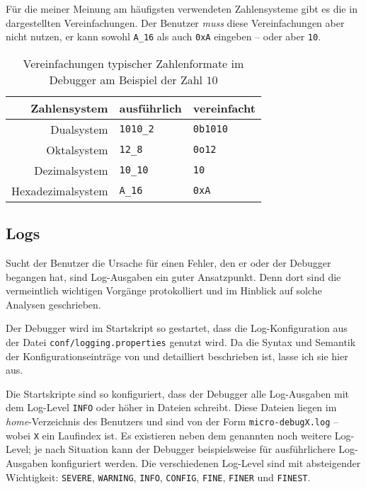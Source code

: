 Für die meiner Meinung am häufigsten verwendeten Zahlensysteme gibt es die in  dargestellten Vereinfachungen. Der Benutzer \emph{muss} diese Vereinfachungen aber nicht nutzen, er kann sowohl \texttt{A\_16} als auch \texttt{0xA} eingeben -- oder aber \texttt{10}.

\begin{table}[h]
  \centering
  \begin{tabular}[h]{|rll|}
    \hline
    \textbf{Zahlensystem} & \textbf{ausführlich} & \textbf{vereinfacht}\\
    \hline
    Dualsystem        & \texttt{1010\_2} & \texttt{0b1010} \\
    Oktalsystem       & \texttt{12\_8}   & \texttt{0o12}   \\
    Dezimalsystem     & \texttt{10\_10}  & \texttt{10}     \\
    Hexadezimalsystem & \texttt{A\_16}   & \texttt{0xA}    \\
    \hline
  \end{tabular}
  \caption{Vereinfachungen typischer Zahlenformate im Debugger am Beispiel der Zahl $10$}
\end{table}

\subsection{Logs}
Sucht der Benutzer die Ursache für einen Fehler, den er oder der Debugger begangen hat, sind Log-Ausgaben ein guter Ansatzpunkt. Denn dort sind die vermeintlich wichtigen Vorgänge protokolliert und im Hinblick auf solche Analysen geschrieben.

Der Debugger wird im Startskript so gestartet, dass die Log-Konfiguration aus der Datei \texttt{conf/logging.properties} genutzt wird. Da die Syntax und Semantik der Konfigurationseinträge von  \cite{Oracle2004} und  \cite{Vogel2012} detailliert beschrieben ist, lasse ich sie hier aus.

Die Startskripte sind so konfiguriert, dass der Debugger alle Log-Ausgaben mit dem Log-Level \texttt{INFO} oder höher in Dateien schreibt. Diese Dateien liegen im \emph{home}-Verzeichnis des Benutzers und sind von der Form \texttt{micro-debugX.log} -- wobei \texttt{X} ein Laufindex ist. Es existieren neben dem genannten noch weitere Log-Level; je nach Situation kann der Debugger beispielsweise für ausführlichere Log-Ausgaben konfiguriert werden. Die verschiedenen Log-Level sind mit absteigender Wichtigkeit: \texttt{SEVERE}, \texttt{WARNING}, \texttt{INFO}, \texttt{CONFIG}, \texttt{FINE}, \texttt{FINER} und \texttt{FINEST}.


